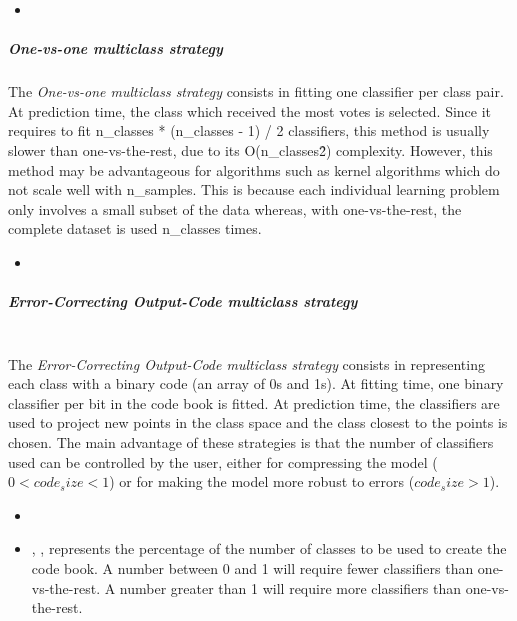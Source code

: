 \begin{itemize}
  \item \estimatorDescription{}
\end{itemize}

\subparagraph{One-vs-one multiclass strategy}
\mbox{}

The \textit{One-vs-one multiclass strategy} consists in fitting one classifier
per class pair.
%
At prediction time, the class which received the most votes is selected.
%
Since it requires to fit n\_classes * (n\_classes - 1) / 2 classifiers, this
method is usually slower than one-vs-the-rest, due to its O(n\_classes\^2)
complexity.
%
However, this method may be advantageous for algorithms such as kernel
algorithms which do not scale well with n\_samples.
%
This is because each individual learning problem only involves a small subset of
the data whereas, with one-vs-the-rest, the complete dataset is used n\_classes
times.

\begin{itemize}
  \item \estimatorDescription{}
\end{itemize}

\subparagraph{Error-Correcting Output-Code multiclass strategy}
\mbox{}
\\The \textit{Error-Correcting Output-Code multiclass strategy} consists in
representing each class with a binary code (an array of 0s and 1s).
%
At fitting time, one binary classifier per bit in the code book is fitted.
%
At prediction time, the classifiers are used to project new points in the class
space and the class closest to the points is chosen.
%
The main advantage of these strategies is that the number of classifiers used
can be controlled by the user, either for compressing the model ($0 < code_size
< 1$) or for making the model more robust to errors ($code_size > 1$).

\begin{itemize}
  \item \estimatorDescription{}
  \item {}, , represents the
  percentage of the number of classes to be used to create the code book.
  A number between 0 and 1 will require fewer classifiers than one-vs-the-rest.
  A number greater than 1 will require more classifiers than one-vs-the-rest.
\end{itemize}

